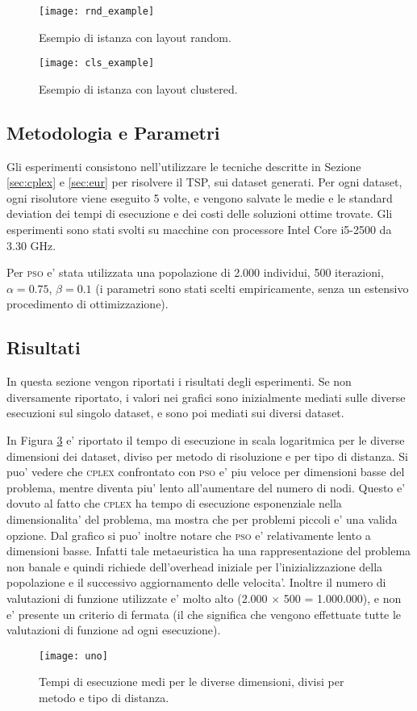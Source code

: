 \documentclass[
12pt, %
a4paper, %
oneside, %
headinclude,footinclude, %
BCOR5mm, %
]{scrartcl}
\begin{document}
\begin{figure}[H]
	\centering
	\texttt{[image: rnd\_example]}
	\caption[random]{Esempio di istanza con layout random.}
	\label{fig:rnd}
\end{figure}

\begin{figure}[H]
	\centering
	\texttt{[image: cls\_example]}
	\caption[clustered]{Esempio di istanza con layout clustered.}
	\label{fig:cls}
\end{figure}

\subsection{Metodologia e Parametri}

Gli esperimenti consistono nell'utilizzare le tecniche descritte in Sezione \ref{sec:cplex} e \ref{sec:eur} per risolvere il TSP, sui dataset generati. Per ogni dataset, ogni risolutore viene eseguito 5 volte, e vengono salvate le medie e le standard deviation dei tempi di esecuzione e dei costi delle soluzioni ottime trovate. Gli esperimenti sono stati svolti su macchine con processore Intel Core i5-2500 da 3.30 GHz. 

Per \textsc{pso} e' stata utilizzata una popolazione di 2.000 individui, 500 iterazioni, $\alpha = 0.75$, $\beta=0.1$ (i parametri sono stati scelti empiricamente, senza un estensivo procedimento di ottimizzazione).

\subsection{Risultati}
In questa sezione vengon riportati i risultati degli esperimenti. Se non diversamente riportato, i valori nei grafici sono inizialmente mediati sulle diverse esecuzioni sul singolo dataset, e sono poi mediati sui diversi dataset.

In Figura \ref{fig:uno} e' riportato il tempo di esecuzione in scala logaritmica per le diverse dimensioni dei dataset, diviso per metodo di risoluzione e per tipo di distanza. Si puo' vedere che \textsc{cplex} confrontato con \textsc{pso} e' piu veloce per dimensioni basse del problema, mentre diventa piu' lento all'aumentare del numero di nodi. Questo e' dovuto al fatto che \textsc{cplex} ha tempo di esecuzione esponenziale nella dimensionalita' del problema, ma mostra che per problemi piccoli e' una valida opzione. Dal grafico si puo' inoltre notare che \textsc{pso} e' relativamente lento a dimensioni basse. Infatti tale metaeuristica ha una rappresentazione del problema non banale e quindi richiede dell'overhead iniziale per l'inizializzazione della popolazione e il successivo aggiornamento delle velocita'. Inoltre il numero di valutazioni di funzione utilizzate e' molto alto (2.000 $\times$ 500 = 1.000.000), e non e' presente un criterio di fermata (il che significa che vengono effettuate tutte le valutazioni di funzione ad ogni esecuzione).
\begin{figure}[htpb]
	\centering
	\texttt{[image: uno]}
	\caption[]{Tempi di esecuzione medi per le diverse dimensioni, divisi per metodo e tipo di distanza.}
	\label{fig:uno}
\end{figure}
\end{document}
